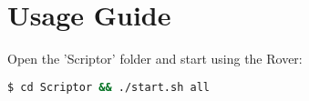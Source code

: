 \section{Usage Guide}
Open the 'Scriptor' folder and start using the Rover: 
\begin{lstlisting}[language=bash]
$ cd Scriptor && ./start.sh all
\end{lstlisting}
